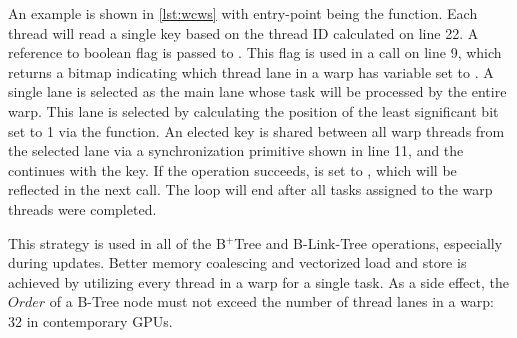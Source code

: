 An example is shown in \cref{lst:wcws} with entry-point being the  function. Each thread will read a single key based on the thread ID calculated on line 22. A reference to  boolean flag is passed to . This flag is used in a  call on line 9, which returns a bitmap indicating which thread lane in a warp has  variable set to . A single lane is selected as the main lane whose task will be processed by the entire warp. This lane is selected by calculating the position of the least significant bit set to 1 via the  function. An elected key is shared between all warp threads from the selected lane via a synchronization primitive shown in line 11, and the  continues with the key. If the operation succeeds,  is set to , which will be reflected in the next  call. The loop will end after all tasks assigned to the warp threads were completed.

This strategy is used in all of the B$^+$Tree and B-Link-Tree operations, especially during updates. Better memory coalescing and vectorized load and store is achieved by utilizing every thread in a warp for a single task. As a side effect, the $Order$ of a B-Tree node must not exceed the number of thread lanes in a warp: 32 in contemporary GPUs.